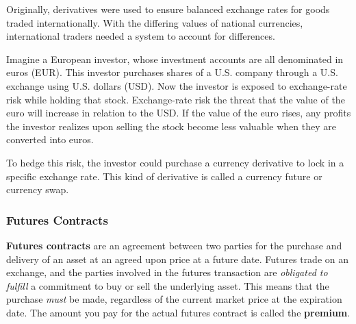 \documentclass{article}
\begin{document}
    Originally, derivatives were used to ensure balanced exchange rates for goods traded internationally. With the differing values of national currencies, international traders needed a system to account for differences. 

    \begin{example}
      Imagine a European investor, whose investment accounts are all denominated in euros (EUR). This investor purchases shares of a U.S. company through a U.S. exchange using U.S. dollars (USD). Now the investor is exposed to exchange-rate risk while holding that stock. Exchange-rate risk the threat that the value of the euro will increase in relation to the USD. If the value of the euro rises, any profits the investor realizes upon selling the stock become less valuable when they are converted into euros.

      To hedge this risk, the investor could purchase a currency derivative to lock in a specific exchange rate. This kind of derivative is called a currency future or currency swap. 
    \end{example}

    \subsubsection{Futures Contracts}

      \begin{definition}
        \textbf{Futures contracts} are an agreement between two parties for the purchase and delivery of an asset at an agreed upon price at a future date. Futures trade on an exchange, and the parties involved in the futures transaction are \textit{obligated to fulfill} a commitment to buy or sell the underlying asset. This means that the purchase \textit{must} be made, regardless of the current market price at the expiration date. The amount you pay for the actual futures contract is called the \textbf{premium}. 
      \end{definition}
\end{document}
